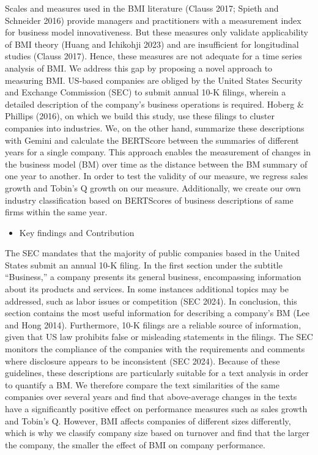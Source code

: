 \documentclass[
]{article}
\providecommand{\tightlist}{%
  \setlength{\itemsep}{0pt}\setlength{\parskip}{0pt}}\usepackage{longtable,booktabs,array}
\begin{document}
Scales and measures used in the BMI literature (Clauss 2017; Spieth and
Schneider 2016) provide managers and practitioners with a measurement
index for business model innovativeness. But these measures only
validate applicability of BMI theory (Huang and Ichikohji 2023) and are
insufficient for longitudinal studies (Clauss 2017). Hence, these
measures are not adequate for a time series analysis of BMI. We address
this gap by proposing a novel approach to measuring BMI. US-based
companies are obliged by the United States Security and Exchange
Commission (SEC) to submit annual 10-K filings, wherein a detailed
description of the company's business operations is required. Hoberg \&
Phillips (2016), on which we build this study, use these filings to
cluster companies into industries. We, on the other hand, summarize
these descriptions with Gemini and calculate the BERTScore between the
summaries of different years for a single company. This approach enables
the measurement of changes in the business model (BM) over time as the
distance between the BM summary of one year to another. In order to test
the validity of our measure, we regress sales growth and Tobin's Q
growth on our measure. Additionally, we create our own industry
classification based on BERTScores of business descriptions of same
firms within the same year.

\begin{itemize}
\tightlist
\item
  Key findings and Contribution
\end{itemize}

The SEC mandates that the majority of public companies based in the
United States submit an annual 10-K filing. In the first section under
the subtitle ``Business,'' a company presents its general business,
encompassing information about its products and services. In some
instances additional topics may be addressed, such as labor issues or
competition (SEC 2024). In conclusion, this section contains the most
useful information for describing a company's BM (Lee and Hong 2014).
Furthermore, 10-K filings are a reliable source of information, given
that US law prohibits false or misleading statements in the filings. The
SEC monitors the compliance of the companies with the requirements and
comments where disclosure appears to be inconsistent (SEC 2024). Because
of these guidelines, these descriptions are particularly suitable for a
text analysis in order to quantify a BM. We therefore compare the text
similarities of the same companies over several years and find that
above-average changes in the texts have a significantly positive effect
on performance measures such as sales growth and Tobin's Q. However, BMI
affects companies of different sizes differently, which is why we
classify company size based on turnover and find that the larger the
company, the smaller the effect of BMI on company performance.
\end{document}
